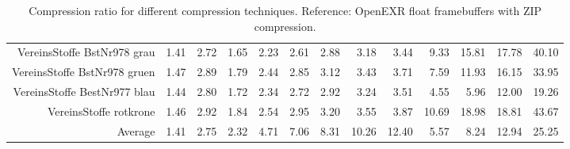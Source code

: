 \begin{landscape}
\begin{table}
\begin{tabularx}{\linewidth}{r | rr | rrrrrr | rrrr}
        VereinsStoffe BstNr978 grau & 1.41& 2.72& 1.65& 2.23& 2.61& 2.88& 3.18& 3.44& 9.33& 15.81& 17.78& 40.10\\
        VereinsStoffe BstNr978 gruen & 1.47& 2.89& 1.79& 2.44& 2.85& 3.12& 3.43& 3.71& 7.59& 11.93& 16.15& 33.95\\
        VereinsStoffe BestNr977 blau & 1.44& 2.80& 1.72& 2.34& 2.72& 2.92& 3.24& 3.51& 4.55& 5.96& 12.00& 19.26\\
        VereinsStoffe rotkrone & 1.46& 2.92& 1.84& 2.54& 2.95& 3.20& 3.55& 3.87& 10.69& 18.98& 18.81& 43.67\\
        \midrule
        Average& 1.41& 2.75& 2.32& 4.71& 7.06& 8.31& 10.26& 12.40& 5.57& 8.24& 12.94& 25.25\\
        \bottomrule
    \end{tabularx}
    \caption{Compression ratio for different compression techniques. Reference: OpenEXR float framebuffers with ZIP compression.}
    \end{table}
\end{landscape}

